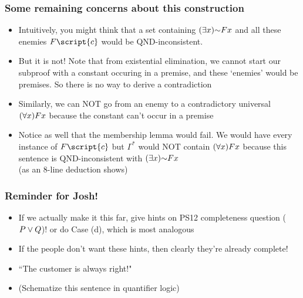 \begin{frame}
\frametitle{Some remaining concerns about this construction}

\begin{itemize}[<+->]

\item Intuitively, you might think that a set containing $\qt{\exists}{x}\enot Fx$ and all these enemies $F\script{c}$ would be QND-inconsistent.

\item But it is not! Note that from existential elimination, we cannot start our subproof with a constant occuring in a premise, and these `enemies' would be premises. So there is no way to derive a contradiction

\item Similarly, we can NOT go from an enemy to a contradictory universal $(\forall x)Fx$ because the constant can't occur in a premise

\item Notice as well that the membership lemma would fail. We would have every instance of $F\script{c}$ but $\Gamma^{\ast}$ would NOT contain $(\forall x)Fx$ because this sentence is QND-inconsistent with $\qt{\exists}{x}\enot Fx$ \\ (as an 8-line deduction shows)

\end{itemize}
\end{frame}

\iffalse

\begin{frame}
\frametitle{Reminder for Josh!}

\begin{itemize}[<+->]

\item If we actually make it this far, give hints on PS12 completeness question ($P \vee Q$)! or do Case (d), which is most analogous 

\item If the people don't want these hints, then clearly they're already complete!

\item ``The customer is always right!"

\item (Schematize this sentence in quantifier logic)


\end{itemize}
\end{frame}

